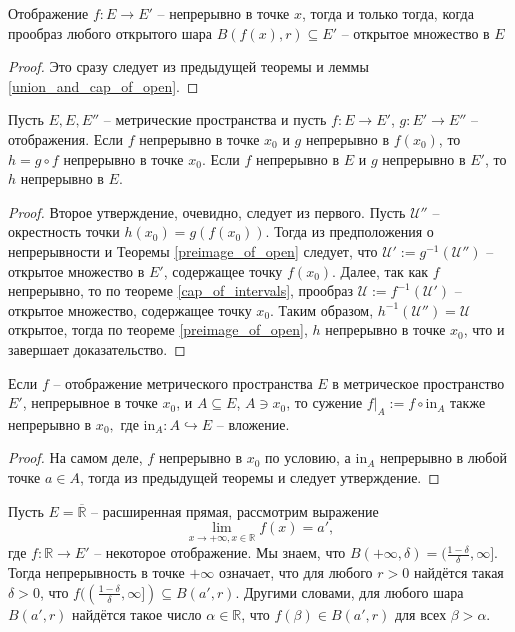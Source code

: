 \begin{corollary}
    Отображение $f:E \to E'$ -- непрерывно в точке $x$, тогда и только тогда, когда прообраз любого открытого шара $B(f(x),r) \subseteq E'$ -- открытое множество в $E$
\end{corollary}
\begin{proof}
    Это сразу следует из предыдущей теоремы и леммы \ref{union_and_cap_of_open}.
\end{proof}

\begin{theorem}\label{comp_of_continous}
    Пусть $E,E,E''$ -- метрические пространства и пусть $f:E \to E'$, $g:E' \to E''$ -- отображения. Если $f$ непрерывно в точке $x_0$ и $g$ непрерывно в $f(x_0)$, то $h = g \circ f$ непрерывно в точке $x_0.$ Если $f$ непрерывно в $E$ и $g$ непрерывно в $E'$, то $h$ непрерывно в $E.$
\end{theorem}
 \begin{proof}
     Второе утверждение, очевидно, следует из первого. Пусть $\mathscr{U}''$ -- окрестность точки $h(x_0) =  g(f(x_0))$. Тогда из предположения о непрерывности и Теоремы \ref{preimage_of_open} следует, что $\mathscr{U}':=g^{-1}(\mathscr{U}'')$ -- открытое множество в $E'$, содержащее точку $f(x_0)$. Далее, так как $f$ непрерывно, то по теореме \ref{cap_of_intervals}, прообраз $\mathscr{U}:=f^{-1}(\mathscr{U}')$ -- открытое множество, содержащее точку $x_0$. Таким образом, $h^{-1}(\mathscr{U}'') = \mathscr{U}$ открытое, тогда по теореме \ref{preimage_of_open}, $h$ непрерывно в точке $x_0$, что и завершает доказательство. 
 \end{proof}


\begin{corollary}\label{restriction}
    Если $f$ -- отображение метрического пространства $E$ в метрическое пространство $E'$, непрерывное в точке $x_0$, и $A \subseteq E$, $A \ni x_0$, то сужение $f|_A:=f \circ \mathrm{in}_A$ также непрерывно в $x_0,$ где $\mathrm{in}_A:A \hookrightarrow E$ -- вложение.
\end{corollary}
\begin{proof}
    На самом деле, $f$ непрерывно в $x_0$ по условию, а $\mathrm{in}_A$ непрерывно в любой точке $a \in A$, тогда из предыдущей теоремы и следует утверждение.
\end{proof}

 \begin{remark}\label{+infty}
    Пусть $E = \overline{\mathbb{R}}$ -- расширенная прямая, рассмотрим выражение $$\lim_{x \to +\infty, x \in \mathbb{{R}}}f(x) = a',$$ где $f:\mathbb{R} \to E' $ -- некоторое отображение. Мы знаем, что $B(+\infty, \delta) = (\frac{1-\delta}{\delta}, \infty]$. Тогда непрерывность в точке $+\infty$ означает, что для любого $r >0$ найдётся такая $\delta>0$, что $f((\frac{1-\delta}{\delta}, \infty]) \subseteq B(a',r)$. Другими словами, для любого шара $B(a',r)$ найдётся такое число $\alpha \in \mathbb{R}$, что $f(\beta) \in B(a',r)$ для всех $\beta > \alpha.$
\end{remark}





